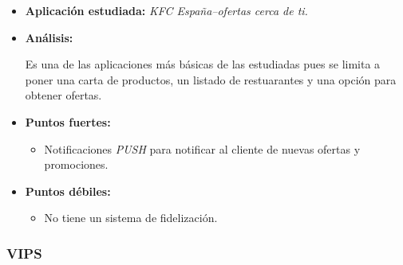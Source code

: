 \documentclass[twoside]{report}
\begin{document}
\begin{itemize}
\item \textbf{Aplicación estudiada:} \cite{kfcapp} \textit{KFC España–ofertas cerca de ti.}
\item \textbf{Análisis:} 

Es una de las aplicaciones más básicas de las estudiadas pues se limita a poner una carta de productos, un listado de restuarantes y una opción para obtener ofertas.

\item \textbf{Puntos fuertes:}
	\begin{itemize}
	\item Notificaciones \textit{PUSH} para notificar al cliente de nuevas ofertas y promociones.
	\end{itemize}
\item \textbf{Puntos débiles:}
	\begin{itemize}
	\item No tiene un sistema de fidelización.
	\end{itemize}
\end{itemize}

\subsubsection{VIPS}
\end{document}
